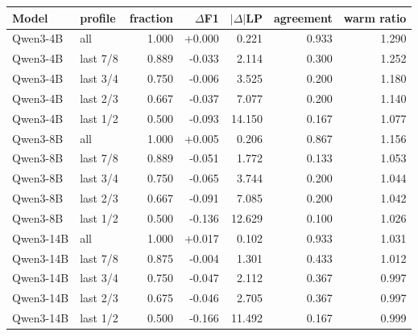 \begin{tabular}{llrrrrr}
\toprule
Model & profile & fraction & $\Delta$F1 & $|\Delta|$LP & agreement & warm ratio \\
\midrule
Qwen3-4B & all & 1.000 & +0.000 & 0.221 & 0.933 & 1.290 \\
Qwen3-4B & last 7/8 & 0.889 & -0.033 & 2.114 & 0.300 & 1.252 \\
Qwen3-4B & last 3/4 & 0.750 & -0.006 & 3.525 & 0.200 & 1.180 \\
Qwen3-4B & last 2/3 & 0.667 & -0.037 & 7.077 & 0.200 & 1.140 \\
Qwen3-4B & last 1/2 & 0.500 & -0.093 & 14.150 & 0.167 & 1.077 \\
Qwen3-8B & all & 1.000 & +0.005 & 0.206 & 0.867 & 1.156 \\
Qwen3-8B & last 7/8 & 0.889 & -0.051 & 1.772 & 0.133 & 1.053 \\
Qwen3-8B & last 3/4 & 0.750 & -0.065 & 3.744 & 0.200 & 1.044 \\
Qwen3-8B & last 2/3 & 0.667 & -0.091 & 7.085 & 0.200 & 1.042 \\
Qwen3-8B & last 1/2 & 0.500 & -0.136 & 12.629 & 0.100 & 1.026 \\
Qwen3-14B & all & 1.000 & +0.017 & 0.102 & 0.933 & 1.031 \\
Qwen3-14B & last 7/8 & 0.875 & -0.004 & 1.301 & 0.433 & 1.012 \\
Qwen3-14B & last 3/4 & 0.750 & -0.047 & 2.112 & 0.367 & 0.997 \\
Qwen3-14B & last 2/3 & 0.675 & -0.046 & 2.705 & 0.367 & 0.997 \\
Qwen3-14B & last 1/2 & 0.500 & -0.166 & 11.492 & 0.167 & 0.999 \\
\bottomrule
\end{tabular}
